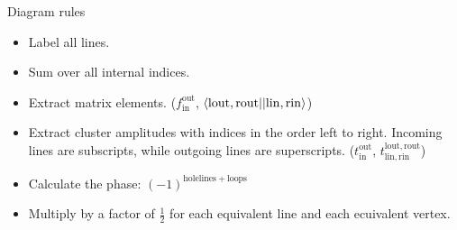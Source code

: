 \begin{frame}{Diagram rules }

    \begin{itemize}
        \item Label all lines. \pause
        \item Sum over all internal indices. \pause
        \item Extract matrix elements. 
            ($f_{\mathrm{in}}^{\mathrm{out}}$, 
            $\langle\mathrm{lout, rout}||\mathrm{lin, rin}\rangle$) \pause
        \item Extract cluster amplitudes with indices in the order left to right. Incoming lines are subscripts, while outgoing lines are superscripts. ($t_{\mathrm{in}}^{\mathrm{out}}$,
                        $t^{\mathrm{lout, rout}}_{\mathrm{lin, rin}}$)\pause
        \item Calculate the phase: $(-1)^{\mathrm{holelines} + \mathrm{loops}}$ \pause
        \item Multiply by a factor of $\frac{1}{2}$ for each equivalent line and each ecuivalent vertex.
    \end{itemize}

\end{frame}

    

